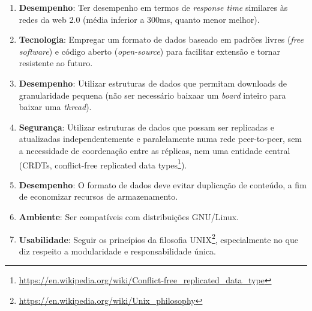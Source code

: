 \begin{enumerate}
    \item \textbf{Desempenho}: Ter desempenho em termos de \textit{response time} similares às redes da web 2.0 (média inferior a 300ms, quanto menor melhor).
    \item \textbf{Tecnologia}: Empregar um formato de dados baseado em padrões livres (\textit{free software}) e código aberto (\textit{open-source}) para facilitar extensão e tornar resistente ao futuro\footnotemark.
    \item \textbf{Desempenho}: Utilizar estruturas de dados que permitam downloads de granularidade pequena (não ser necessário baixaar um \textit{board} inteiro para baixar uma \textit{thread}).
    \item \textbf{Segurança}: Utilizar estruturas de dados que possam ser replicadas e atualizadas independentemente e paralelamente numa rede peer-to-peer, sem a necessidade de coordenação entre as réplicas, nem uma entidade central (CRDTs, conflict-free replicated data types\footnote{\url{https://en.wikipedia.org/wiki/Conflict-free_replicated_data_type}}).
    \item \textbf{Desempenho}: O formato de dados deve evitar duplicação de conteúdo, a fim de economizar recursos de armazenamento.
    \item \textbf{Ambiente}: Ser compatíveis com distribuições GNU/Linux.
    \item \textbf{Usabilidade}: Seguir os princípios da filosofia UNIX\footnote{\url{https://en.wikipedia.org/wiki/Unix_philosophy}}, especialmente no que diz respeito a modularidade e responsabilidade única.
\end{enumerate}

%     

